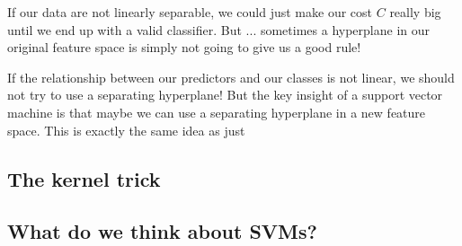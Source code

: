 If our data are not linearly separable, we could just make our cost $C$ really big until we end up with a valid classifier. But ... sometimes a hyperplane in our original feature space is simply not going to give us a good rule!

If the relationship between our predictors and our classes is not linear, we should not try to use a separating hyperplane! But the key insight of a support vector machine is that maybe we can use a separating hyperplane in a new feature space. This is exactly the same idea as just 



\subsection{The kernel trick}


\subsection{What do we think about SVMs?}







